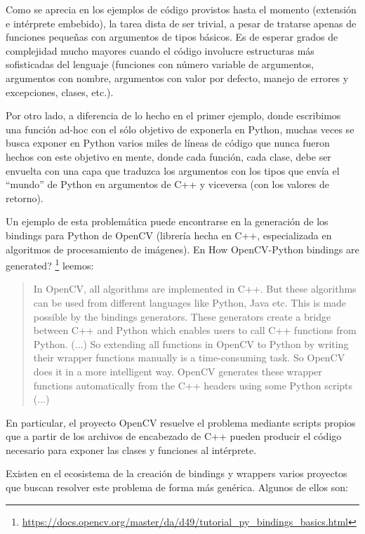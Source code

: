 Como se aprecia en los ejemplos de código provistos hasta el momento (extensión
e intérprete embebido), la tarea dista de ser trivial, a pesar de tratarse
apenas de funciones pequeñas con argumentos de tipos básicos. Es de esperar
grados de complejidad mucho mayores cuando el código involucre estructuras más
sofisticadas del lenguaje (funciones con número variable de argumentos,
argumentos con nombre, argumentos con valor por defecto, manejo de errores y
excepciones, clases, etc.).

Por otro lado, a diferencia de lo hecho en el primer ejemplo, donde escribimos
una función ad-hoc con el sólo objetivo de exponerla en Python, muchas veces se
busca exponer en Python varios miles de líneas de código que nunca fueron
hechos con este objetivo en mente, donde cada función, cada clase, debe ser
envuelta con una capa que traduzca los argumentos con los tipos que envía el
``mundo'' de Python en argumentos de C++ y viceversa (con los valores de
retorno).

Un ejemplo de esta problemática puede encontrarse en la generación de los
bindings para Python de OpenCV (librería hecha en C++, especializada en
algoritmos de procesamiento de imágenes). En How OpenCV-Python bindings are
generated?
\footnote{\url{https://docs.opencv.org/master/da/d49/tutorial_py_bindings_basics.html}}
leemos:

\begin{quotation}
In OpenCV, all algorithms are implemented in C++. But these algorithms can be
used from different languages like Python, Java etc. This is made possible by
the bindings generators. These generators create a bridge between C++ and
Python which enables users to call C++ functions from Python. (...)  So
extending all functions in OpenCV to Python by writing their wrapper functions
manually is a time-consuming task. So OpenCV does it in a more intelligent way.
OpenCV generates these wrapper functions automatically from the C++ headers
using some Python scripts (...)
\end{quotation}

En particular, el proyecto OpenCV resuelve el problema mediante scripts propios
que a partir de los archivos de encabezado de C++ pueden producir el código
necesario para exponer las clases y funciones al intérprete. 

Existen en el ecosistema de la creación de bindings y wrappers varios proyectos
que buscan resolver este problema de forma más genérica. Algunos de ellos son:

